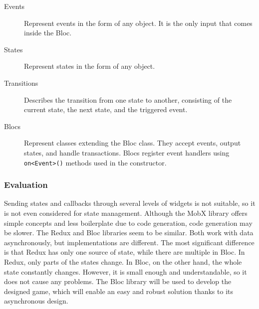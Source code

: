 \begin{description}
    \item[Events] Represent events in the form of any object.
    It is the only input that comes inside the Bloc.
    \item[States] Represent states in the form of any object.
    \item[Transitions] Describes the transition from one state to another, consisting of the current state, the next state, and the triggered event.
    \item[Blocs] Represent classes extending the Bloc class.
    They accept events, output states, and handle transactions.
    Blocs register event handlers using \texttt{on<Event>()} methods used in the constructor.
\end{description}

\subsubsection{Evaluation}

Sending states and callbacks through several levels of widgets is not suitable, so it is not even considered for state management.
Although the MobX library offers simple concepts and less boilerplate due to code generation, code generation may be slower.
The Redux and Bloc libraries seem to be similar.
Both work with data asynchronously, but implementations are different.
The most significant difference is that Redux has only one source of state, while there are multiple in Bloc.
In Redux, only parts of the states change.
In Bloc, on the other hand, the whole state constantly changes.
However, it is small enough and understandable, so it does not cause any problems.
The Bloc library will be used to develop the designed game, which will enable an easy and robust solution thanks to its asynchronous design.
